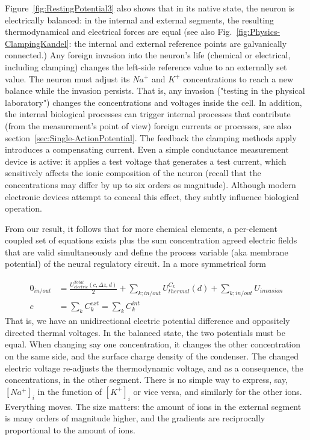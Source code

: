 Figure~\ref{fig:RestingPotential3} also shows that
in its native state, the neuron is electrically balanced: in the
internal and external segments, the resulting thermodynamical and electrical forces are equal
(see also Fig.~\ref{fig:Physics-ClampingKandel}: the internal
and external reference points are galvanically connected.)
Any foreign invasion into the neuron's life (chemical or electrical, including clamping) changes the left-side reference value to
an externally set value. The neuron must adjust its $Na^+$ and $K^+$ concentrations to reach a new balance while the invasion persists. That is, any invasion ("testing in the physical laboratory") changes the concentrations and voltages 
inside the cell. In addition, the internal biological processes can trigger internal processes that contribute (from the measurement's point of view) foreign currents or processes, see also section~\ref{sec:Single-ActionPotential}. The feedback the clamping methods apply introduces a compensating current. Even a simple conductance measurement device is active: it applies a test voltage that generates a test current, which sensitively affects the ionic composition of the neuron (recall that the concentrations may differ by up to six orders os magnitude). Although modern electronic devices attempt to conceal this effect, they subtly influence biological operation.

From our result, it follows that for more chemical elements, a per-element coupled set of equations exists plus the sum concentration
agreed electric fields that are valid simultaneously and define the process variable (aka membrane potential) of the neural regulatory circuit.
In a more symmetrical form

\begin{align}
	0_{in/out} &=\frac{U_{electric}^{Total}(c,\Delta z,d)}{2} + \sum_{k;in/out} U_{thermal}^{C_k}(d)+ \sum_{
k; in/out} U_{invasion}\\
	c &=\sum_k C_k^{ext} =\sum_k C_k^{int}	\label{eq:coupling}
\end{align}
That is, we have an unidirectional electric potential difference and oppositely directed thermal voltages. In the balanced state, the two potentials must be equal.
When changing say one concentration, it changes the other concentration on the same side, and the surface charge density of the condenser. The changed electric voltage 
re-adjusts the thermodynamic voltage, and as a consequence,  the concentrations, in the other segment.
There is no simple way to express, say,
$[Na^+]_i$ in the function of $[K^+]_i$ or vice versa, and similarly for the other ions. Everything moves.
The size matters: the amount of ions in the external segment is many orders of magnitude higher, and the gradients are reciprocally proportional to the amount of ions.

